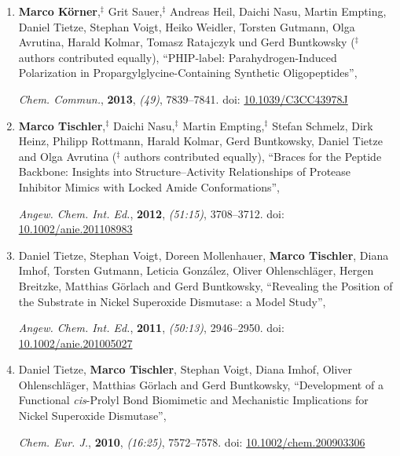 \documentclass{scrartcl}
\begin{document}
\begin{enumerate}
\item \textbf{Marco Körner},$^\ddagger$ Grit Sauer,$^\ddagger$   Andreas Heil, Daichi Nasu, Martin Empting, Daniel Tietze, Stephan Voigt, Heiko Weidler, Torsten Gutmann, Olga Avrutina, Harald Kolmar, Tomasz Ratajczyk und Gerd Buntkowsky ($^\ddagger$ authors contributed equally),   
\enquote{PHIP-label: Parahydrogen-Induced Polarization in Propargylglycine-Containing Synthetic Oligopeptides},

\emph{Chem. Commun.}, \textbf{2013}, \emph{(49)}, 7839--7841. doi:  \href{http://dx.doi.org/10.1039/C3CC43978J}{10.1039/C3CC43978J}

\item \textbf{Marco Tischler},$^\ddagger$ Daichi Nasu,$^\ddagger$ Martin Empting,$^\ddagger$ Stefan Schmelz, Dirk Heinz, Philipp Rottmann, Harald Kolmar, Gerd Buntkowsky, Daniel Tietze and Olga Avrutina ($^\ddagger$ authors contributed equally),
\enquote{Braces for the Peptide Backbone: Insights into Structure--Activity Relationships of Protease Inhibitor Mimics with Locked Amide Conformations},

\emph{Angew. Chem. Int. Ed.}, \textbf{2012}, \emph{(51:15)}, 3708--3712. doi: \href{http://dx.doi.org/10.1002/anie.201108983}{10.1002/anie.201108983}

\item Daniel Tietze, Stephan Voigt, Doreen Mollenhauer, \textbf{Marco Tischler}, Diana Imhof, Torsten Gutmann, Leticia Gonz\'alez, Oliver Ohlenschl\"ager, Hergen Breitzke, Mat\-thias G\"orlach and Gerd Buntkowsky,
\enquote{Revealing the Position of the Substrate in Nickel Superoxide Dismutase: a Model Study},

\emph{Angew. Chem. Int. Ed.}, \textbf{2011}, \emph{(50:13)}, 2946--2950. doi: \href{http://dx.doi.org/10.1002/anie.201005027}{10.1002/anie.201005027}

\item Daniel Tietze, \textbf{Marco Tischler}, Stephan Voigt, Diana Imhof, Oliver Ohlenschl\"ager, Mat\-thias G\"orlach and Gerd Buntkowsky,
\enquote{Development of a Functional \emph{cis}-Prolyl Bond Biomimetic and Mechanistic Implications for Nickel Superoxide Dis\-mutase},

\emph{Chem.  Eur. J.}, \textbf{2010}, \emph{(16:25)}, 7572--7578. doi: \href{http://dx.doi.org/10.1002/chem.200903306}{10.1002/chem.200903306}
\end{enumerate}

\clearpage
\end{document}
